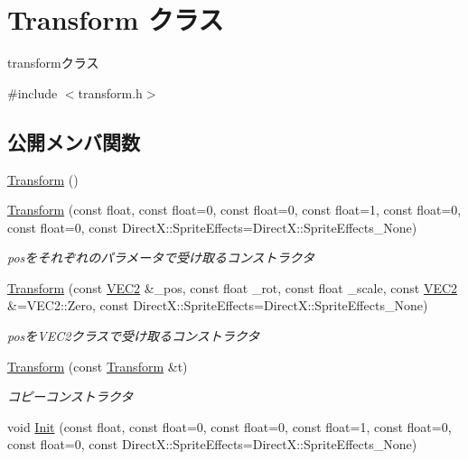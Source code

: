 \hypertarget{class_transform}{}\section{Transform クラス}
\label{class_transform}


transformクラス  




{\ttfamily \#include $<$transform.\+h$>$}

\subsection*{公開メンバ関数}
\begin{DoxyCompactItemize}
\item 
\mbox{\hyperlink{class_transform_aa08ca4266efabc768973cdeea51945ab}{Transform}} ()
\item 
\mbox{\hyperlink{class_transform_a1ef60253d5f6ab5d263f217dfb76f27e}{Transform}} (const float, const float=0, const float=0, const float=1, const float=0, const float=0, const Direct\+X\+::\+Sprite\+Effects=Direct\+X\+::\+Sprite\+Effects\+\_\+\+None)
\begin{DoxyCompactList}\small\item\em posをそれぞれのパラメータで受け取るコンストラクタ \end{DoxyCompactList}\item 
\mbox{\hyperlink{class_transform_a4f54eae11d72f529d5d22d207de5494e}{Transform}} (const \mbox{\hyperlink{common_8h_afb0c5e21d4133ff4f200992c0b534e1b}{V\+E\+C2}} \&\+\_\+pos, const float \+\_\+rot, const float \+\_\+scale, const \mbox{\hyperlink{common_8h_afb0c5e21d4133ff4f200992c0b534e1b}{V\+E\+C2}} \&=V\+E\+C2\+::\+Zero, const Direct\+X\+::\+Sprite\+Effects=Direct\+X\+::\+Sprite\+Effects\+\_\+\+None)
\begin{DoxyCompactList}\small\item\em posを\+V\+E\+C2クラスで受け取るコンストラクタ \end{DoxyCompactList}\item 
\mbox{\hyperlink{class_transform_a7790f3c5dfe2b7fe7997af5f23e2ec7d}{Transform}} (const \mbox{\hyperlink{class_transform}{Transform}} \&t)
\begin{DoxyCompactList}\small\item\em コピーコンストラクタ \end{DoxyCompactList}\item 
void \mbox{\hyperlink{class_transform_a4445dcada4d075e1994b78b660d96a6d}{Init}} (const float, const float=0, const float=0, const float=1, const float=0, const float=0, const Direct\+X\+::\+Sprite\+Effects=Direct\+X\+::\+Sprite\+Effects\+\_\+\+None)

\end{DoxyCompactItemize}

